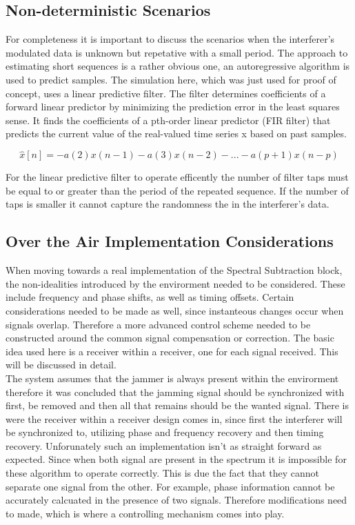 \subsection{Non-deterministic Scenarios}

For completeness it is important to discuss the scenarios when the interferer's modulated data is unknown but repetative with a small period.  The approach to estimating short sequences is a rather obvious one, an autoregressive algorithm is used to predict samples.  The simulation here, which was just used for proof of concept, uses a linear predictive filter.  The filter determines coefficients of a forward linear predictor by minimizing the prediction error in the least squares sense\cite{lpcfilter}.  It finds the coefficients of a pth-order linear predictor (FIR filter) that predicts the current value of the real-valued time series x based on past samples.

\[ \hat{x}[n]=-a(2)x(n-1)-a(3)x(n-2)-...-a(p+1)x(n-p)\]

For the linear predictive filter to operate efficently the number of filter taps must be equal to or greater than the period of the repeated sequence.  If the number of taps is smaller it cannot capture the randomness the in the interferer's data.\\

\subsection{Over the Air Implementation Considerations}

When moving towards a real implementation of the Spectral Subtraction block, the non-idealities introduced by the envirorment needed to be considered.  These include frequency and phase shifts, as well as timing offsets.  Certain considerations needed to be made as well, since instanteous changes occur when signals overlap.  Therefore a more advanced control scheme needed to be constructed around the common signal compensation or correction.  The basic idea used here is a receiver within a receiver, one for each signal received.  This will be discussed in detail.\\

The system assumes that the jammer is always present within the envirorment therefore it was concluded that the jamming signal should be synchronized with first, be removed and then all that remains should be the wanted signal.  There is were the receiver within a receiver design comes in, since first the interferer will be synchronized to, utilizing phase and frequency recovery and then timing recovery.  Unforunately such an implementation isn't as straight forward as expected.  Since when both signal are present in the spectrum it is impossible for these algorithm to operate correctly.  This is due the fact that they cannot separate one signal from the other.  For example, phase information cannot be accurately calcuated in the presence of two signals.  Therefore modifications need to made, which is where a controlling mechanism comes into play.\\

